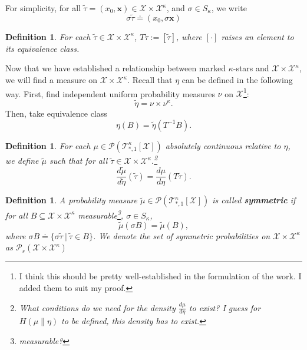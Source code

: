\documentclass[12pt]{article}
\newtheorem{definition}[theorem]{Definition}
\numberwithin{equation}{section}
\begin{document}
For simplicity, for all $\widetilde{\tau} = (x_0, \mathbf{x})\in \mathcal{X}\times\mathcal{X}^\kappa$, and $\sigma\in S_\kappa$, we write
\begin{equation*}
    \sigma\widetilde{\tau} \doteq (x_0, \sigma\mathbf{x})
\end{equation*}

\begin{definition}
    For each $\widetilde{\tau} \in \mathcal{X}\times\mathcal{X}^\kappa$, $T\widetilde{\tau} := [\widetilde{\tau}]$, where $[\cdot]$ raises an element
    to its equivalence class.
\end{definition}

Now that we have established a relationship between marked $\kappa$-stars and $\mathcal{X}\times\mathcal{X}^\kappa$, we will find a measure on
$\mathcal{X}\times\mathcal{X}^\kappa$. Recall that $\eta$ can be defined in the following way. First, find independent uniform probability measures
$\nu$ on $\mathcal{X}$\footnote{I think this should be pretty well-established in the formulation of the work. I added them to suit my proof.}:
\begin{equation*}
    \widetilde{\eta} = \nu \times \nu^\kappa.
\end{equation*}
Then, take equivalence class
\begin{equation*}
    \eta(B) = \widetilde{\eta}(T^{-1} B).
\end{equation*}

\begin{definition}
    For each $\mu \in \mathcal{P}(\mathcal{T}^\kappa_{*, 1}[\mathcal{X}])$ absolutely continuous relative to $\eta$, we define $\widetilde{\mu}$ such that for all $\widetilde{\tau}\in \mathcal{X}\times\mathcal{X}^\kappa$.\footnote{What conditions do we need for the density $\frac{d \mu}{d \eta}$ to exist? I guess for $H(\mu\|\eta)$ to be defined, this density has to exist.}
    \begin{equation}\label{XY-tilde-def}
        \frac{d\widetilde{\mu}}{d \widetilde{\eta}} (\widetilde{\tau}) =  \frac{d \mu}{d \eta} (T \widetilde{\tau}).
    \end{equation}
\end{definition}

\begin{definition}
    A probability measure $\widetilde{\mu}\in \mathcal{P}(\mathcal{T}^\kappa_{*, 1}[\mathcal{X}])$ is called \textbf{symmetric} if for all $B\subseteq \mathcal{X}\times\mathcal{X}^\kappa$ measurable\footnote{measurable?}, $\sigma\in S_\kappa$,
    \begin{equation*}
        \widetilde\mu(\sigma B) = \widetilde{\mu}(B),
    \end{equation*}
    where $\sigma B \doteq \{\sigma\widetilde{\tau}\ |\ \widetilde{\tau}\in B\}$. We denote the set of symmetric probabilities on $\mathcal{X}\times \mathcal{X}^\kappa$ as $\mathcal{P}_s(\mathcal{X}\times \mathcal{X}^\kappa)$
\end{definition}
\end{document}
